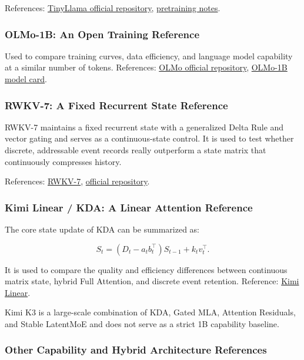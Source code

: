 References: \href{https://github.com/jzhang38/tinyllama}{TinyLlama official repository}, \href{https://github.com/jzhang38/TinyLlama/blob/main/PRETRAIN.md}{pretraining notes}.

\subsubsection{OLMo-1B: An Open Training Reference}

Used to compare training curves, data efficiency, and language model capability at a similar number of tokens. References: \href{https://github.com/allenai/OLMo}{OLMo official repository}, \href{https://huggingface.co/allenai/OLMo-1B}{OLMo-1B model card}.

\subsubsection{RWKV-7: A Fixed Recurrent State Reference}

RWKV-7 maintains a fixed recurrent state with a generalized Delta Rule and vector gating and serves as a continuous-state control. It is used to test whether discrete, addressable event records really outperform a state matrix that continuously compresses history.

References: \href{https://arxiv.org/abs/2503.14456}{RWKV-7}, \href{https://github.com/BlinkDL/RWKV-LM}{official repository}.

\subsubsection{Kimi Linear / KDA: A Linear Attention Reference}

The core state update of KDA can be summarized as:

\[
S_t=(D_t-a_tb_t^\top)S_{t-1}+k_tv_t^\top.
\]

It is used to compare the quality and efficiency differences between continuous matrix state, hybrid Full Attention, and discrete event retention. Reference: \href{https://arxiv.org/abs/2510.26692}{Kimi Linear}.

Kimi K3 is a large-scale combination of KDA, Gated MLA, Attention Residuals, and Stable LatentMoE and does not serve as a strict 1B capability baseline.

\subsubsection{Other Capability and Hybrid Architecture References}

